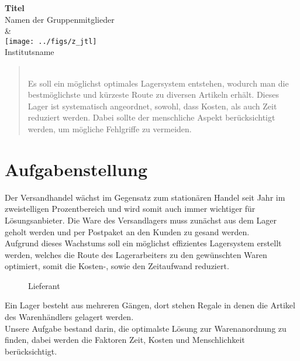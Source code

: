 \documentclass[pagenumoff]{kit-document}
\begin{document}
	
	\begin{center}
		{\bfseries\LARGE Titel}
		\\[1ex] Namen der Gruppenmitglieder
		\\[1ex] \&
		\\ \texttt{[image: ../figs/z\_jtl]}
		\\ \scriptsize Institutsname
	\end{center}
	
	
	\begin{abstract}
		\\
		Es soll ein möglichst optimales Lagersystem entstehen, wodurch man die bestmöglichste und kürzeste Route zu diversen 			Artikeln erhält. Dieses Lager ist systematisch angeordnet, sowohl, dass Kosten, als auch Zeit reduziert werden. Dabei 		                      sollte 	der menschliche Aspekt berücksichtigt werden, um mögliche Fehlgriffe zu vermeiden. \\
			 \noindent
		 
	\end{abstract}
	
	
	\section{Aufgabenstellung}
	
	Der Versandhandel wächst im Gegensatz zum stationären Handel seit Jahr im zweistelligen Prozentbereich und wird somit auch immer wichtiger für Lösungsanbieter. Die Ware des Versandlagers muss zunächst aus dem Lager geholt werden und per Postpaket an den Kunden zu gesand werden. \\ Aufgrund dieses Wachstums soll ein möglichst effizientes Lagersystem erstellt werden, welches die Route des Lagerarbeiters zu den gewünschten Waren optimiert, somit die Kosten-, sowie den Zeitaufwand reduziert.
	\begin{figure}[ht]
		\centering
		\caption{Lieferant}
	\end{figure}
	

	
Ein Lager besteht aus mehreren Gängen, dort stehen Regale in denen die Artikel des Warenhändlers gelagert werden. \\
Unsere Aufgabe bestand darin, die optimalste Lösung zur Warenanordnung zu finden, dabei werden die Faktoren Zeit, Kosten und Menschlichkeit berücksichtigt.
\end{document}
